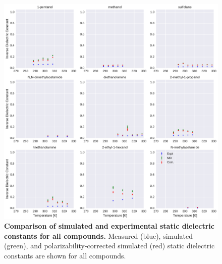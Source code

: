 \documentclass[journal=jacsat,manuscript=article]{achemso}
\begin{document}
\begin{figure}[alldielectric]

\ContinuedFloat

\includegraphics[width=\textwidth]{./figures/dielectric_versus_temperature_part2.pdf}

\caption{{\bf Comparison of simulated and experimental static dielectric constants for all compounds.}
Measured (blue), simulated (green), and polarizability-corrected simulated (red) static dielectric constants are shown for all compounds.
}

\label{figure:AllDielectrics}

\end{figure}
\end{document}
